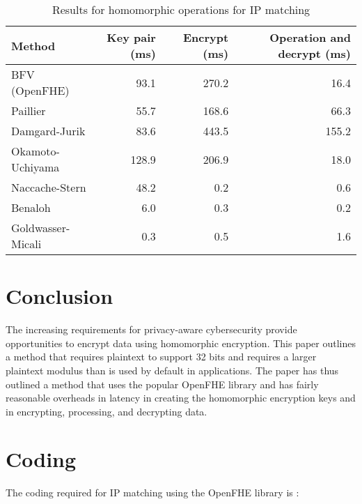 \documentclass[envcountsame,runningheads,notitlepage]{llncs}
\begin{document}
\begin{table*}
\begin{center}
\begin{tabular}{ l r r r}
\hline
Method & Key pair (ms) & Encrypt (ms) & Operation and decrypt (ms)\\
\hline
BFV (OpenFHE) \cite{OpenFHE} & 93.1  & 270.2 & 16.4 \\
Paillier \cite{paillier1999public} & 55.7 & 168.6 & 66.3\\
Damgard-Jurik \cite{damgaard2010generalization} & 83.6 & 443.5 & 155.2\\
Okamoto-Uchiyama \cite{okamoto1998new} &  128.9 & 206.9 & 18.0\\
Naccache-Stern \cite{naccache1997new} & 48.2 & 0.2 & 0.6\\
Benaloh & 6.0 & 0.3 & 0.2\\
Goldwasser-Micali \cite{goldwasser2019probabilistic} & 0.3 &  0.5 & 1.6\\
\hline
\end{tabular}
\label{table}\caption{Results for homomorphic operations for IP matching}
\end{center}
\end{table*}



\section{Conclusion}
The increasing requirements for privacy-aware cybersecurity provide opportunities to encrypt data using homomorphic encryption. This paper outlines a method that requires plaintext to support 32 bits and requires a larger plaintext modulus than is used by default in applications. The paper has thus outlined a method that uses the popular OpenFHE library and has fairly reasonable overheads in latency in creating the homomorphic encryption keys and in encrypting, processing, and decrypting data. 

\section{Coding}
The coding required for IP matching using the OpenFHE library is \cite{ip_mask}:
\end{document}
